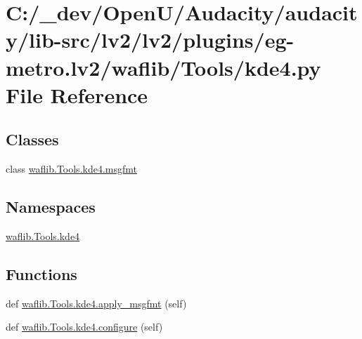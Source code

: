 \hypertarget{lv2_2plugins_2eg-metro_8lv2_2waflib_2_tools_2kde4_8py}{}\section{C\+:/\+\_\+dev/\+Open\+U/\+Audacity/audacity/lib-\/src/lv2/lv2/plugins/eg-\/metro.lv2/waflib/\+Tools/kde4.py File Reference}
\label{lv2_2plugins_2eg-metro_8lv2_2waflib_2_tools_2kde4_8py}
\subsection*{Classes}
\begin{DoxyCompactItemize}
\item 
class \hyperlink{classwaflib_1_1_tools_1_1kde4_1_1msgfmt}{waflib.\+Tools.\+kde4.\+msgfmt}
\end{DoxyCompactItemize}
\subsection*{Namespaces}
\begin{DoxyCompactItemize}
\item 
 \hyperlink{namespacewaflib_1_1_tools_1_1kde4}{waflib.\+Tools.\+kde4}
\end{DoxyCompactItemize}
\subsection*{Functions}
\begin{DoxyCompactItemize}
\item 
def \hyperlink{namespacewaflib_1_1_tools_1_1kde4_a62b36b23c1da96a111189ea65c2c6baa}{waflib.\+Tools.\+kde4.\+apply\+\_\+msgfmt} (self)
\item 
def \hyperlink{namespacewaflib_1_1_tools_1_1kde4_a6ffba63774560559cef87345d1613418}{waflib.\+Tools.\+kde4.\+configure} (self)
\end{DoxyCompactItemize}
